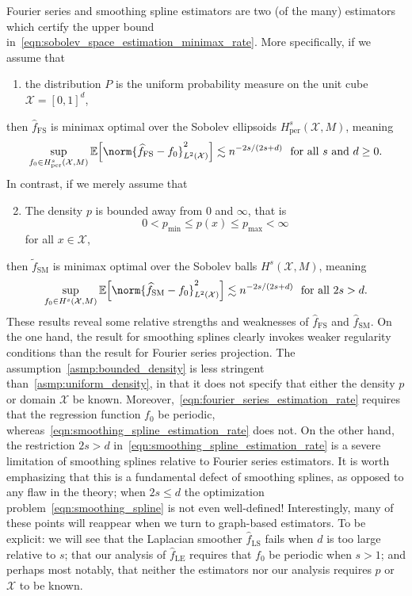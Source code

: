 \documentclass{article}
\newcommand{\1}{\mathbf{1}}
\newcommand{\Xset}{\mathcal{X}}
\newcommand{\Ebb}{\mathbb{E}}
\newcommand{\wt}[1]{\widetilde{#1}}
\newcommand{\wh}[1]{\widehat{#1}}
\newcommand{\LE}{\mathrm{LE}}
\newcommand{\LS}{\mathrm{LS}}
\newcommand{\SM}{\mathrm{SM}}
\newcommand{\OS}{\mathrm{FS}}
\theoremstyle{alden}
\theoremstyle{aldenthm}
\theoremstyle{definition}
\theoremstyle{remark}
\begin{document}
Fourier series and smoothing spline estimators are two (of the many) estimators which certify the upper bound in~\eqref{eqn:sobolev_space_estimation_minimax_rate}. More specifically, if we assume that
\begin{enumerate}[label=(P\arabic*)]
	\item
	\label{asmp:uniform_density}
	the distribution $P$ is the uniform probability measure on the unit cube $\Xset = [0,1]^d$,
\end{enumerate}
then $\wh{f}_{\OS}$ is minimax optimal over the Sobolev ellipsoids $H_{\mathrm{per}}^s(\Xset, M)$, meaning
\begin{equation}
\label{eqn:fourier_series_estimation_rate}
\sup_{f_0 \in H_{\mathrm{per}}^s(\Xset,M)}\Ebb\Bigl[\norm{\wh{f}_{\OS} - f_0}_{L^2(\Xset)}^2\Bigr]  \lesssim n^{-2s/(2s + d)}~~\textrm{for all $s$ and $d \geq 0$.}
\end{equation}
In contrast, if we merely assume that
\begin{enumerate}[label=(P\arabic*)]
	\setcounter{enumi}{1}
	\item 
	\label{asmp:bounded_density}
	The density $p$ is bounded away from $0$ and $\infty$, that is
	\begin{equation*}
	0 < p_{\min} \leq p(x) \leq p_{\max} < \infty
	\end{equation*}
	for all $x \in \Xset$,
\end{enumerate}
then $\wt{f}_{\SM}$ is minimax optimal over the Sobolev balls $H^s(\Xset,M)$, meaning
\begin{equation}
\label{eqn:smoothing_spline_estimation_rate}
\sup_{f_0 \in H^s(\Xset,M)}\Ebb\Bigl[\norm{\wh{f}_{\SM} - f_0}_{L^2(\Xset)}^2\Bigr]  \lesssim n^{-2s/(2s + d)}~~\textrm{for all $2s > d$.}
\end{equation}
These results reveal some relative strengths and weaknesses of $\wh{f}_{\OS}$ and $\wh{f}_{\SM}$. On the one hand, the result for smoothing splines clearly invokes weaker regularity conditions than the result for Fourier series projection. The assumption~\ref{asmp:bounded_density} is less stringent than~\ref{asmp:uniform_density}, in that it does not specify that either the density $p$ or domain $\Xset$ be known. Moreover,~\eqref{eqn:fourier_series_estimation_rate} requires that the regression function $f_0$ be periodic, whereas~\eqref{eqn:smoothing_spline_estimation_rate} does not. On the other hand, the restriction $2s > d$ in~\eqref{eqn:smoothing_spline_estimation_rate} is a severe limitation of smoothing splines relative to Fourier series estimators. It is worth emphasizing that this is a fundamental defect of smoothing splines, as opposed to any flaw in the theory; when $2s \leq d$ the optimization problem~\eqref{eqn:smoothing_spline} is not even well-defined! Interestingly, many of these points will reappear when we turn to graph-based estimators. To be explicit: we will see that the Laplacian smoother $\wh{f}_{\LS}$ fails when $d$ is too large relative to $s$; that our analysis of $\wh{f}_{\LE}$ requires that $f_0$ be periodic when $s > 1$; and perhaps most notably, that neither the estimators nor our analysis requires $p$ or $\Xset$ to be known.
\end{document}
